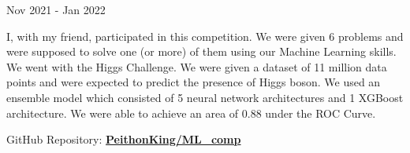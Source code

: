 	
	\hspace*{8.2mm}\faCalendar Nov 2021 - Jan 2022
	\vspace{-2mm}
	\begin{justify}
		I, with my friend, participated in this competition. We were given 6 problems and were supposed to solve one (or more) of them using our Machine Learning skills. We went with the Higgs Challenge. We were given a dataset of 11 million data points and were expected to predict the presence of Higgs boson. We used an ensemble model which consisted of 5 neural network architectures and 1 XGBoost architecture. We were able to achieve an area of 0.88 under the ROC Curve.

		\vspace{3mm}

		\noindent GitHub Repository: \href{https://github.com/PeithonKing/ML_comp}{\textbf{PeithonKing/ML\_comp}}
	\end{justify}